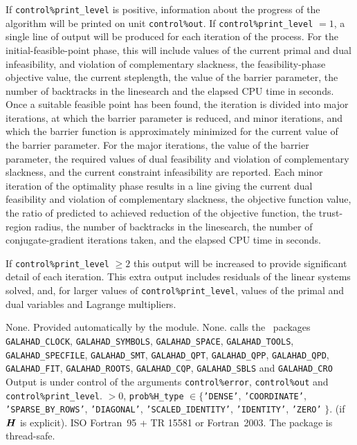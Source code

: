\documentclass{galahad}
\newcommand{\packagename}{BQPB}
\begin{document}

\galinfo
If {\tt control\%print\_level} is positive, information about the progress
of the algorithm will be printed on unit {\tt control\-\%out}.
If {\tt control\%print\_level} $= 1$, a single line of output will be produced
for each iteration of the process.
For the initial-feasible-point phase,
this will include values of the current primal and dual infeasibility, and
violation of complementary slackness, the feasibility-phase objective value,
the current steplength, the value of the barrier parameter, the
number of backtracks in the linesearch and the elapsed CPU time in seconds.
Once a suitable feasible point has been found, the iteration is divided
into major iterations, at which the barrier parameter is reduced, and
minor iterations, and which the barrier function is approximately minimized
for the current value of the barrier parameter. For the major iterations,
the value of the barrier parameter, the required values of
dual feasibility and violation of complementary slackness, and the current
constraint infeasibility are reported. Each minor iteration of the
optimality phase results in a line giving
the current dual feasibility and violation of complementary slackness, the
objective function value, the ratio of predicted to achieved reduction
of the objective function, the trust-region radius, the
number of backtracks in the linesearch, the number of conjugate-gradient
iterations taken, and the elapsed CPU time in seconds.

If {\tt control\%print\_level} $\geq 2$ this
output will be increased to provide significant detail of each iteration.
This extra output includes residuals of the linear systems solved, and,
for larger values of {\tt control\%print\_level}, values of the primal and dual
variables and Lagrange multipliers.


\galgeneral

\galcommon None.
\galworkspace Provided automatically by the module.
\galroutines None.
\galmodules {\tt \packagename\_solve} calls the \galahad\ packages
{\tt GALAHAD\_CLOCK},
{\tt GALAHAD\_SY\-M\-BOLS},
{\tt GALA\-HAD\_SPACE},
{\tt GAL\-AHAD\_TOOLS},
{\tt GALAHAD\_SPECFILE},
{\tt GALAHAD\_SMT},
{\tt GALAHAD\_QPT},
{\tt GALAHAD\_QPP},
{\tt GALAHAD\_QPD},
{\tt GALAHAD\_FIT},
{\tt GALAHAD\_ROOTS},
{\tt GALAHAD\_CQP},
{\tt GALAHAD\_SBLS}
and
{\tt GALAHAD\_CRO}
\galio Output is under control of the arguments
 {\tt control\%error}, {\tt control\%out} and {\tt control\%print\_level}.
 $> 0$, 
{\tt prob\%H\_type} $\in \{${\tt 'DENSE'},
 {\tt 'COORDINATE'}, {\tt 'SPARSE\_BY\_\-ROWS'}, {\tt 'DIAGONAL'},
 {\tt 'SCALED\_IDENTITY'}, {\tt 'IDENTITY'}, {\tt 'ZERO'} $\}$.
(if ${\bm{H}}$ is explicit).
\galportability ISO Fortran~95 + TR 15581 or Fortran~2003.
The package is thread-safe.
\end{document}
